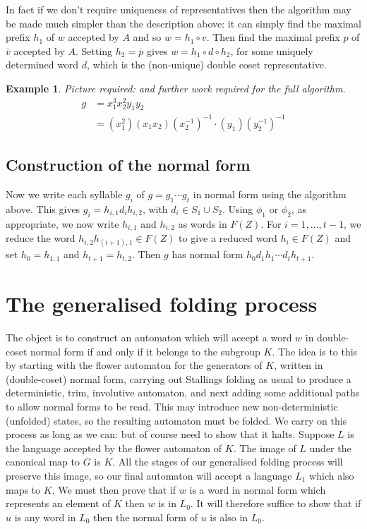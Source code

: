 \documentclass[a4paper,12pt]{article}
\newtheorem{exam}[theorem]{Example}
\newenvironment{example}{\begin{exam} \rm}{\end{exam}}
\numberwithin{equation}{section}
\numberwithin{figure}{section}
\begin{document}
In fact if we don't require uniqueness of representatives then the algorithm 
may be made much simpler than the description above: it can 
simply find the maximal prefix $h_1$ of $w$  accepted  by $A$  and so $w=h_1\circ v$. Then find the
maximal prefix $p$ of $\bar v$ accepted by $A$. Setting $h_2=\bar p$ gives $w=h_1\circ d \circ h_2$, for
some uniquely determined word $d$, which is the (non-unique) 
double coset representative. 


\begin{example}
Picture required: and further work required for the full algorithm.
\begin{align*} 
g &= x_1^3x_2^2y_1y_2 \\ 
&= (x_1^2)(x_1x_2)(x_2^{-1})^{-1} \cdot (y_1)(y_2^{-1})^{-1}
\end{align*}
\end{example}

\subsection{Construction of the normal form}

Now we write each syllable $g_i$ of $g=g_1\cdots g_t$ in normal form using the algorithm above. 
This gives $g_i=h_{i,1}d_ih_{i,2}$, with $d_i\in S_1\cup S_2$. Using $\phi_1$ or $\phi_2$, as appropriate,
we now write $h_{i,1}$ and $h_{i,2}$ as words in $F(Z)$. For $i=1,\ldots , t-1$, we reduce the 
word $h_{i,2}h_{(i+1),1}\in F(Z)$ to give a reduced word $h_i\in F(Z)$ and set $h_0=h_{1,1}$ and  $h_{t+1}=h_{t,2}$.
Then $g$ has normal form $h_0d_1h_1\cdots d_th_{t+1}$.
%
%
\section{The generalised folding process}
The object is to construct an automaton which will accept a word $w$
in double-coset normal form if and only if it belongs to the subgroup $K$.
The idea is to this by starting with the flower automaton for the 
generators of $K$, written in (double-coset) normal form, carrying out
Stallings folding as usual to produce a deterministic, trim, involutive
automaton, and next adding some additional paths to allow normal forms
to be read. This may introduce new non-deterministic (unfolded) states, so
the resulting automaton must be folded. We carry on this process as long
as we can: but of course need to show that it halts. Suppose $L$ is the 
language accepted by the flower automaton of $K$. The image of $L$ under
the canonical map to $G$ is $K$. All the stages of our generalised folding
process will preserve this image, so our final automaton will accept a language
$L_1$ which also maps to $K$. We must then prove that if $w$ is a word
in normal form which represents an element of $K$ then $w$ is in $L_0$. It will
therefore suffice to show that if $u$ is any word in $L_0$ then the 
normal form of $u$ is also in $L_0$. 
\end{document}
